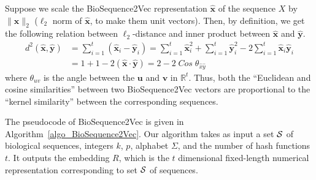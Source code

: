 \documentclass[runningheads]{llncs}
\newcommand{\vect}[1]{\mathbf{#1}}
\begin{document}
Suppose we scale the BioSequence2Vec representation $\vect{\hat{x}}$
of the sequence $X$ by $\|\vect{\hat{x}}\|_2$ ($\ell_2$ norm of
$\vect{\hat{x}}$, to make them unit vectors). Then, by definition, we get the following relation between $\ell_2$-distance and inner
product between $\vect{\hat{x}}$ and $\vect{\hat{y}}$.
\begin{align*}
    d^2 (\vect{\hat{x}},\vect{\hat{y}}) &= \sum_{i=1}^{t} (\vect{\hat{x}}_i - \vect{\hat{y}}_i) = \sum_{i=1}^{t} \vect{\hat{x}}_i^2 + \sum_{i=1}^{t} \vect{\hat{y}}_i^2 - 2 \sum_{i=1}^{t} \vect{\hat{x}}_i \vect{\hat{y}}_i
    \\
   &= 1 + 1 - 2 (\vect{\hat{x}} \cdot \vect{\hat{y}}) = 2 - 2 \; Cos \; \theta_{\hat{x}\hat{y}}
\end{align*}
where $\theta_{uv}$ is the angle between the $\vect{u}$ and $\vect{v}$
in $\mathbb{R}^t$.  Thus, both the ``Euclidean and cosine similarities''
between two BioSequence2Vec vectors are proportional to the ``kernel
similarity'' between the corresponding sequences.




The pseudocode of BioSequence2Vec is given in
Algorithm~\ref{algo_BioSequence2Vec}. 
Our algorithm takes as input a set ${\cal S}$ of biological sequences, integers $k$, $p$, alphabet $\Sigma$, and the number of hash functions $t$. It outputs the embedding $R$, which is the $t$ dimensional fixed-length numerical representation corresponding to set ${\cal S}$ of sequences.
\end{document}
